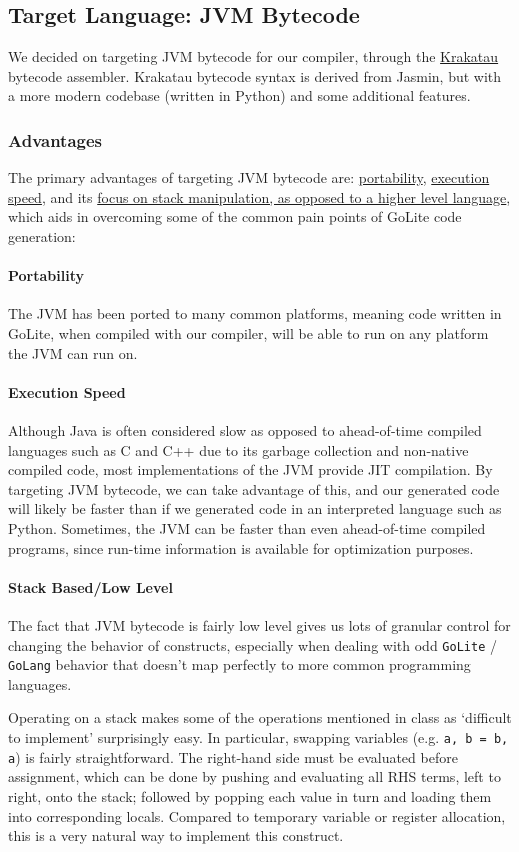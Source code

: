 \documentclass[11pt]{article}
\begin{document}
\subsection{Target Language: JVM Bytecode}
We decided on targeting JVM bytecode for our compiler, through the
\href{https://github.com/Storyyeller/Krakatau}{Krakatau} bytecode assembler. Krakatau bytecode syntax is derived
from Jasmin, but with a more modern codebase (written in Python) and
some additional features.
\subsubsection{Advantages}
The primary advantages of targeting JVM bytecode are: \hyperref[sec:org8296e16]{portability}, \hyperref[sec:orgd33314c]{execution speed}, and its \hyperref[sec:orgec85c24]{focus on stack manipulation, as opposed to a
	higher level language}, which aids in overcoming some of the common
pain points of GoLite code generation:
\paragraph{Portability}
The JVM has been ported to many common platforms, meaning code
written in GoLite, when compiled with our compiler, will be able
to run on any platform the JVM can run on.
\paragraph{Execution Speed}
Although Java is often considered slow as opposed to ahead-of-time
compiled languages such as C and C++ due to its garbage collection
and non-native compiled code, most implementations of the JVM
provide JIT compilation.  By targeting JVM bytecode, we can take
advantage of this, and our generated code will likely be faster
than if we generated code in an interpreted language such as
Python. Sometimes, the JVM can be faster than even ahead-of-time
compiled programs, since run-time information is available for
optimization purposes.
\paragraph{Stack Based/Low Level}
The fact that JVM bytecode is fairly low level gives us lots of
granular control for changing the behavior of constructs,
especially when dealing with odd \texttt{GoLite} / \texttt{GoLang} behavior that
doesn't map perfectly to more common programming languages.

Operating on a stack makes some of the operations mentioned in
class as `difficult to implement' surprisingly easy. In
particular, swapping variables (e.g. \texttt{a, b = b, a}) is fairly
straightforward. The right-hand side must be evaluated before
assignment, which can be done by pushing and evaluating all RHS
terms, left to right, onto the stack; followed by popping each
value in turn and loading them into corresponding locals. Compared
to temporary variable or register allocation, this is a very
natural way to implement this construct.
\end{document}
